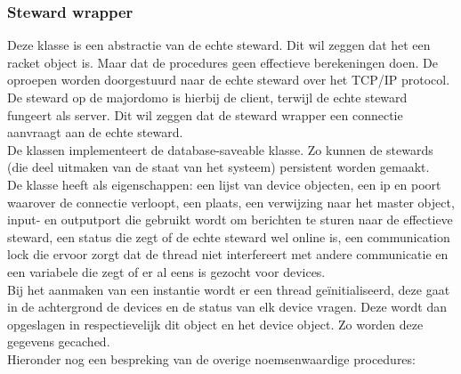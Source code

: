 \documentclass{article}
\begin{document}
\subsubsection{Steward wrapper}
\label{ssub:steward}
Deze klasse is een abstractie van de echte steward. Dit wil zeggen dat het een racket object is. Maar dat de procedures geen effectieve berekeningen doen. De oproepen worden doorgestuurd naar de echte steward over het TCP/IP protocol. De steward op de majordomo is hierbij de client, terwijl de echte steward fungeert als server. Dit wil zeggen dat de steward wrapper een connectie aanvraagt aan de echte steward.\\
De klassen implementeert de database-saveable klasse. Zo kunnen de stewards (die deel uitmaken van de staat van het systeem) persistent worden gemaakt. \\
De klasse heeft als eigenschappen: een lijst van device objecten, een ip en poort waarover de connectie verloopt, een plaats, een verwijzing naar het master object, input- en outputport die gebruikt wordt om berichten te sturen naar de effectieve steward, een status die zegt of de echte steward wel online is, een communication lock die ervoor zorgt dat de thread niet interfereert met andere communicatie en een variabele die zegt of er al eens is gezocht voor devices.\\
Bij het aanmaken van een instantie wordt er een thread ge\"initialiseerd, deze gaat in de achtergrond de devices en de status van elk device vragen. Deze wordt dan opgeslagen in respectievelijk dit object en het device object. Zo worden deze gegevens gecached.\\
Hieronder nog een bespreking van de overige noemsenwaardige procedures:
\end{document}
